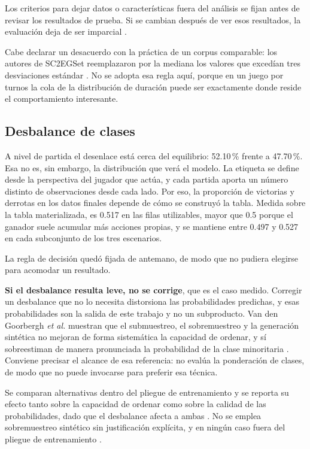 Los criterios para dejar datos o características fuera del análisis se fijan
antes de revisar los resultados de prueba. Si se cambian después de ver esos
resultados, la evaluación deja de ser imparcial
\cite{kaufman_leakage_2011}.

Cabe declarar un desacuerdo con la práctica de un corpus comparable: los
autores de SC2EGSet reemplazaron por la mediana los valores que excedían
tres desviaciones estándar \cite{bialecki_sc2egset_2023}. No se adopta esa
regla aquí, porque en un juego por turnos la cola de la distribución de
duración puede ser exactamente donde reside el comportamiento interesante.

\subsection{Desbalance de clases}
\label{subsec:desbalance}

A nivel de partida el desenlace está cerca del equilibrio: 52.10\,\% frente
a 47.70\,\%. Esa no es, sin embargo, la distribución que verá el modelo. La
etiqueta se define desde la perspectiva del jugador que actúa, y cada
partida aporta un número distinto de observaciones desde cada lado. Por eso,
la proporción de victorias y derrotas en los datos finales depende de cómo
se construyó la tabla.
Medida sobre la tabla materializada, es 0.517 en las filas utilizables,
mayor que 0.5 porque el ganador suele acumular más acciones propias, y se
mantiene entre 0.497 y 0.527 en cada subconjunto de los tres escenarios.

La regla de decisión quedó fijada de antemano, de modo que no pudiera
elegirse para acomodar un resultado.

\noindent\textbf{Si el desbalance resulta leve, no se corrige}, que es el
caso medido. Corregir un
desbalance que no lo necesita distorsiona las probabilidades predichas, y
esas probabilidades son la salida de este trabajo y no un subproducto. Van
den Goorbergh \textit{et al.} muestran que el submuestreo, el sobremuestreo
y la generación sintética no mejoran de forma sistemática la capacidad de
ordenar, y sí sobreestiman de manera pronunciada la probabilidad de la clase
minoritaria \cite{vandenGoorbergh_imbalance_2022}. Conviene precisar el
alcance de esa referencia: no evalúa la ponderación de clases, de modo que
no puede invocarse para preferir esa técnica.

Se comparan alternativas dentro del pliegue de entrenamiento y se reporta
su efecto tanto sobre la capacidad de ordenar como sobre la calidad de las
probabilidades, dado que el desbalance
afecta a ambas \cite{silvafilho_calibration_2023}. No se emplea
sobremuestreo sintético sin justificación explícita, y en ningún caso fuera
del pliegue de entrenamiento \cite{sasse_leakage_2025}.

